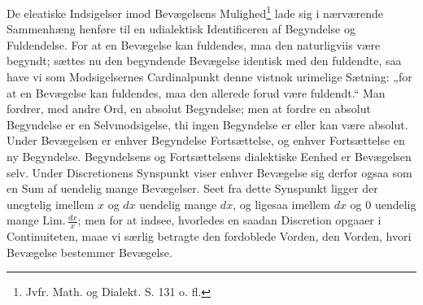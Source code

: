 \documentclass[12pt,a4paper]{book}
\begin{document}
De eleatiske Indsigelser imod Bevægelsens Mulighed\footnote{Jvfr.
Math. og Dialekt. S. 131 o. fl.} lade sig i nærværende Sammenhæng
henføre til en udialektisk Identificeren af Begyndelse og Fuldendelse.
For at en Bevægelse kan fuldendes, maa den naturligviis være begyndt;
sættes nu den begyndende Bevægelse identisk med den fuldendte, saa
have vi som Modsigelsernes Cardinalpunkt denne vistnok urimelige
Sætning: „for at en Bevægelse kan fuldendes, maa den allerede forud
være fuldendt.“ Man fordrer, med andre Ord, en absolut Begyndelse; men
at fordre en absolut Begyndelse er en Selvmodsigelse, thi ingen
Begyndelse er eller kan være absolut. Under Bevægelsen er enhver
Begyndelse Fortsættelse, og enhver Fortsættelse en ny Begyndelse.
Begyndelsens og Fortsættelsens dialektiske Eenhed er Bevægelsen selv.
Under Discretionens Synspunkt viser enhver Bevægelse sig derfor ogsaa
som en Sum af uendelig mange Bevægelser. Seet fra dette Synspunkt
ligger der unegtelig imellem $x$ og $dx$ uendelig mange $dx$, og
ligesaa imellem $dx$ og $0$ uendelig mange $\mathrm{Lim.}\,
\frac{dx}{x}$; men for at indsee, hvorledes en saadan Discretion
opgaaer i Continuiteten, maae vi særlig betragte den fordoblede
Vorden, den Vorden, hvori Bevægelse bestemmer Bevægelse.
\end{document}
